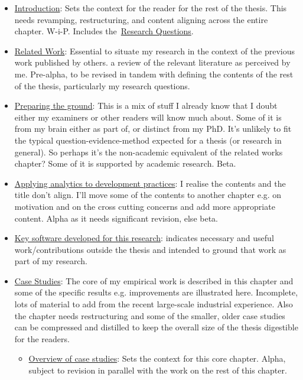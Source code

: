 \begin{itemize}
    \item \href{the-introduction}{Introduction}: Sets the context for the reader for the rest of the thesis. This needs revamping, restructuring, and content aligning across the entire chapter. W-i-P. Includes the~\href{section-research-questions}{Research Questions}.
    \item \href{chapter-related-work}{Related Work}: Essential to situate my research in the context of the previous work published by others. a review of the relevant literature as perceived by me. Pre-alpha, to be revised in tandem with defining the contents of the rest of the thesis, particularly my research questions.
    \item \href{chapter-preparing-the-ground}{Preparing the ground}: This is a mix of stuff I already know that I doubt either my examiners or other readers will know much about. Some of it is from my brain either as part of, or distinct from my PhD. It's unlikely to fit the typical question-evidence-method expected for a thesis (or research in general). So perhaps it's the non-academic equivalent of the related works chapter? Some of it is supported by academic research. Beta.
    \item \href{chapter-applying-analytics-to-development-practices}{Applying analytics to development practices}: I realise the contents and the title don't align. I'll move some of the contents to another chapter e.g. on motivation and on the cross cutting concerns and add more appropriate content. Alpha as it needs significant revision, else beta.
    \item \href{chapter-code-needed}{Key software developed for this research}: indicates necessary and useful work/contributions outside the thesis and intended to ground that work as part of my research.
    \item \href{chapter-case-studies}{Case Studies}: The core of my empirical work is described in this chapter and some of the specific results e.g. improvements are illustrated here. Incomplete, lots of material to add from the recent large-scale industrial experience. Also the chapter needs restructuring and some of the smaller, older case studies can be compressed and distilled to keep the overall size of the thesis digestible for the readers.
    \begin{itemize}
        \item \href{section-overview-of-case-studies}{Overview of case studies}: Sets the context for this core chapter. Alpha, subject to revision in parallel with the work on the rest of this chapter.

\end{itemize}
\end{itemize}
